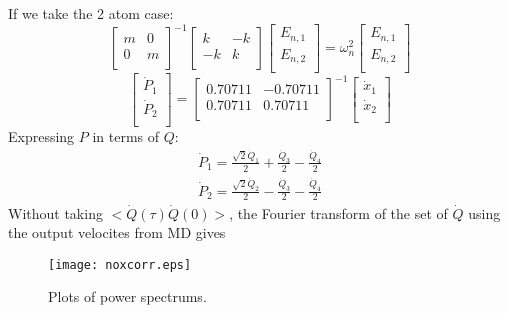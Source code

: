 If we take the 2 atom case:
\begin{equation}
\begin{bmatrix}
   m & 0  \\
   0 & m  \\
\end{bmatrix}^{-1}
\begin{bmatrix}
    k & -k  \\
   -k & k  \\
\end{bmatrix}
\begin{bmatrix}
   E_{n,1} \\
   E_{n,2} \\
\end{bmatrix}
=\omega^2_n
\begin{bmatrix}
   E_{n,1} \\
   E_{n,2} \\
\end{bmatrix}
\end{equation}
\begin{equation}
\begin{bmatrix}
   \dot{P}_1\\
   \dot{P}_2\\
\end{bmatrix}=
\begin{bmatrix}
  0.70711 &  -0.70711 \\
  0.70711 &  0.70711 \\
\end{bmatrix}^{-1}
\begin{bmatrix}
   \dot{x}_1\\
   \dot{x}_2\\
\end{bmatrix}
\end{equation}
Expressing $P$ in terms of $Q$:
\begin{align}
\dot{P}_1=\frac{\sqrt{2}\dot{Q}_1}{2}+\frac{\dot{Q}_3}{2}-\frac{\dot{Q}_4}{2}\\
\dot{P}_2=\frac{\sqrt{2}\dot{Q}_2}{2}-\frac{\dot{Q}_3}{2}-\frac{\dot{Q}_4}{2}
\end{align}
Without taking $<\dot{Q}(\tau)\dot{Q}(0)>$, the Fourier transform of the set of $\dot{Q}$ using the output velocites from MD gives
\begin{figure}[!h]
\centering
\texttt{[image: noxcorr.eps]}
\caption{Plots of power spectrums.}
\label{fig:awesome_image}
\end{figure}

